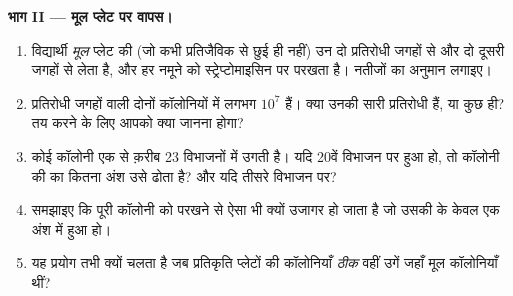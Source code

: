 \begin{problem}
\medskip
\noindent\textbf{भाग II --- मूल प्लेट पर वापस।}
\begin{enumerate}[resume]
  \item विद्यार्थी \emph{मूल} प्लेट की (जो कभी प्रतिजैविक से छुई ही नहीं)
        उन दो प्रतिरोधी जगहों से और दो दूसरी जगहों से  लेता है,
        और हर नमूने को स्ट्रेप्टोमाइसिन पर परखता है। नतीजों का अनुमान
        लगाइए।
  \item प्रतिरोधी जगहों वाली दोनों कॉलोनियों में लगभग $10^7$
         हैं। क्या उनकी सारी  प्रतिरोधी हैं, या कुछ ही?
        तय करने के लिए आपको क्या जानना होगा?
  \item कोई कॉलोनी एक  से क़रीब 23 विभाजनों में उगती है। यदि
         20वें विभाजन पर हुआ हो, तो कॉलोनी की  का
        कितना अंश उसे ढोता है? और यदि तीसरे विभाजन पर?
  \item समझाइए कि पूरी कॉलोनी को परखने से ऐसा  भी क्यों उजागर
        हो जाता है जो उसकी  के केवल एक अंश में हुआ हो।
  \item यह प्रयोग तभी क्यों चलता है जब प्रतिकृति प्लेटों की कॉलोनियाँ
        \emph{ठीक} वहीं उगें जहाँ मूल कॉलोनियाँ थीं?
\end{enumerate}


\end{problem}
